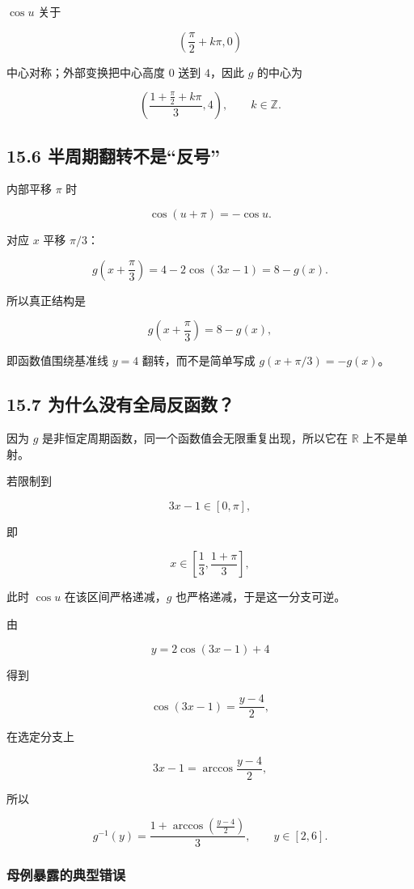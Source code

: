 \documentclass[11pt,a4paper]{ctexart}
\begin{document}
\(\cos u\) 关于

\[
\left(\frac\pi2+k\pi,0\right)
\]

中心对称；外部变换把中心高度 \(0\) 送到 \(4\)，因此 \(g\) 的中心为

\[
\boxed{
\left(
\frac{1+\frac\pi2+k\pi}{3},
4
\right)
},\qquad k\in\mathbb Z.
\]

\subsection{15.6
半周期翻转不是``反号''}\label{ux534aux5468ux671fux7ffbux8f6cux4e0dux662fux53cdux53f7}

内部平移 \(\pi\) 时

\[
\cos(u+\pi)=-\cos u.
\]

对应 \(x\) 平移 \(\pi/3\)：

\[
g\left(x+\frac\pi3\right)
=4-2\cos(3x-1)
=8-g(x).
\]

所以真正结构是

\[
\boxed{g\left(x+\frac\pi3\right)=8-g(x)},
\]

即函数值围绕基准线 \(y=4\) 翻转，而不是简单写成 \(g(x+\pi/3)=-g(x)\)。

\subsection{15.7
为什么没有全局反函数？}\label{ux4e3aux4ec0ux4e48ux6ca1ux6709ux5168ux5c40ux53cdux51fdux6570}

因为 \(g\) 是非恒定周期函数，同一个函数值会无限重复出现，所以它在
\(\mathbb R\) 上不是单射。

若限制到

\[
3x-1\in[0,\pi],
\]

即

\[
x\in\left[\frac13,\frac{1+\pi}{3}\right],
\]

此时 \(\cos u\) 在该区间严格递减，\(g\) 也严格递减，于是这一分支可逆。

由

\[
y=2\cos(3x-1)+4
\]

得到

\[
\cos(3x-1)=\frac{y-4}{2},
\]

在选定分支上

\[
3x-1=\arccos\frac{y-4}{2},
\]

所以

\[
\boxed{
g^{-1}(y)=
\frac{1+\arccos\left(\frac{y-4}{2}\right)}{3}
},
\qquad y\in[2,6].
\]

\subsubsection{母例暴露的典型错误}\label{ux6bcdux4f8bux66b4ux9732ux7684ux5178ux578bux9519ux8bef}
\end{document}
